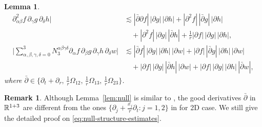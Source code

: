\documentclass[11pt,twoside]{article}
\def\f{\frac}
\def\p{\partial}
\theoremstyle{plain}
\newtheorem{lemma}[theorem]{Lemma}
\theoremstyle{definition}
\theoremstyle{assumption}
\newtheorem{remark}{Remark}[section]
\numberwithin{equation}{section}
\begin{document}
\begin{lemma}
\begin{equation}
\begin{aligned}
				\partial^2_{\alpha\beta}f\,\partial_{\gamma}g\,\partial_{\delta}h
				\big|
				&\lesssim
				|\bar\partial\partial f|\,|\partial g|\,|\partial h|
				+
				|\partial^2 f|\,|\bar\partial g|\,|\partial h|
				\\
				&\quad+
				|\partial^2 f|\,|\partial g|\,|\bar\partial h|
				+
				\frac1r|\partial f|\,|\partial g|\,|\partial h|,
				\\
				\big|
				\sum_{\alpha,\beta,\gamma,\delta=0}^3
				N_3^{\alpha\beta\gamma\delta}
				\partial_{\alpha}f\,\partial_{\beta}g\,\partial_{\gamma}h\,\partial_{\delta}w
				\big|
				&\lesssim
				|\bar\partial f|\,|\partial g|\,|\partial h|\,|\partial w|
				+
				|\partial f|\,|\bar\partial g|\,|\partial h|\,|\partial w|
				\\
				&\quad+
				|\partial f|\,|\partial g|\,|\bar\partial h|\,|\partial w|
				+
				|\partial f|\,|\partial g|\,|\partial h|\,|\bar\partial w|,
			\end{aligned}
		\end{equation}
		where
		$\bar\partial\in\big\{\partial_t+\partial_r,\,
			\frac1r\Omega_{12},\,
			\frac1r\Omega_{13},\,
			\frac1r\Omega_{23}
			\big\}$.
		\end{lemma}
	\begin{remark}
		Although Lemma~\ref{lem:null} is similar to \cite[Lemma 2.5]{HouTaoYin2},
the good derivatives $\bar\partial$ in $\Bbb R^{1+3}$
are different from the ones $\{\p_j+\f{x_j}{r}\p_t: j=1,2\}$ in \cite{HouTaoYin2} for 2D case.
We still give the detailed proof on \eqref{eq:null-structure-estimates}.
	\end{remark}
\end{document}
